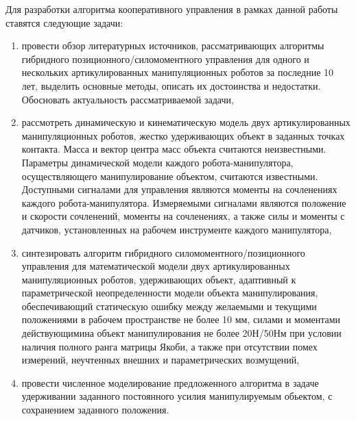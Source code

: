 Для разработки алгоритма кооперативного управления в рамках данной работы ставятся следующие задачи:
\begin{enumerate}
  \item провести  обзор  литературных  источников,  рассматривающих  алгоритмы  гибридного позиционного/силомоментного  управления  для  одного  и  нескольких  артикулированных манипуляционных  роботов  за  последние  10  лет,  выделить  основные  методы,  описать  их достоинства   и   недостатки.   Обосновать   актуальность   рассматриваемой   задачи,
  \item рассмотреть   динамическую   и   кинематическую   модель   двух   артикулированных манипуляционных  роботов,  жестко  удерживающих  объект  в  заданных  точках  контакта. Масса и  вектор центра  масс объекта  считаются неизвестными.  Параметры  динамической модели  каждого  робота-манипулятора,  осуществляющего  манипулирование  объектом, считаются  известными.  Доступными  сигналами  для  управления  являются  моменты  на сочленениях каждого робота-манипулятора. Измеряемыми сигналами являются положение и  скорости  сочленений,  моменты  на  сочленениях,  а  также  силы  и  моменты  с датчиков, установленных   на   рабочем   инструменте   каждого   манипулятора,
  \item синтезировать   алгоритм   гибридного   силомоментного/позиционного   управления   для математической    модели    двух    артикулированных    манипуляционных    роботов, удерживающих объект, адаптивный к параметрической неопределенности модели объекта манипулирования,  обеспечивающий  статическую  ошибку  между  желаемыми  и  текущими положениями в рабочем пространстве не более 10 мм, силами и моментами действующимина  объект  манипулирования  не  более  20Н/50Нм  при  условии  наличия  полного  ранга матрицы  Якоби,  а  также  при  отсутствии  помех  измерений,  неучтенных  внешних  и параметрических  возмущений,
  \item провести  численное  моделирование  предложенного алгоритма  в  задаче  удерживании  заданного  постоянного  усилия  манипулируемым обьектом, с сохранением заданного положения.
\end{enumerate}






%
%
